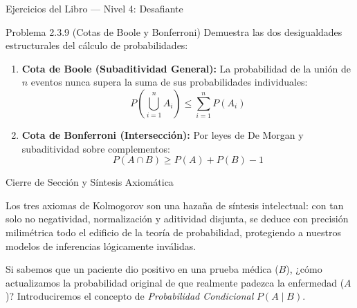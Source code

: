\begin{frame}{Ejercicios del Libro — Nivel 4: Desafiante}
  \small
  \begin{block}{Problema 2.3.9 (Cotas de Boole y Bonferroni)}
    Demuestra las dos desigualdades estructurales del cálculo de probabilidades:
  \end{block}

  \vspace{0.2em}
  \pause
  \begin{enumerate}
    \item \textbf{Cota de Boole (Subaditividad General):} La probabilidad de la unión de $n$ eventos nunca supera la suma de sus probabilidades individuales:
    $$P\left( \bigcup_{i=1}^{n} A_i \right) \leq \sum_{i=1}^{n} P(A_i)$$ \pause
    \item \textbf{Cota de Bonferroni (Intersección):} Por leyes de De Morgan y subaditividad sobre complementos:
    $$P(A \cap B) \geq P(A) + P(B) - 1$$
  \end{enumerate}
\end{frame}

\begin{frame}{Cierre de Sección y Síntesis Axiomática}
  \begin{reflexion}
    Los tres axiomas de Kolmogorov son una hazaña de síntesis intelectual: con tan solo no negatividad, normalización y aditividad disjunta, se deduce con precisión milimétrica todo el edificio de la teoría de probabilidad, protegiendo a nuestros modelos de inferencias lógicamente inválidas.
  \end{reflexion}

  \vspace{0.5em}
  \pause
  \begin{retoclase}
    Si sabemos que un paciente dio positivo en una prueba médica ($B$), ¿cómo actualizamos la probabilidad original de que realmente padezca la enfermedad ($A$)? Introduciremos el concepto de \emph{Probabilidad Condicional} $P(A \mid B)$.
  \end{retoclase}
\end{frame}


